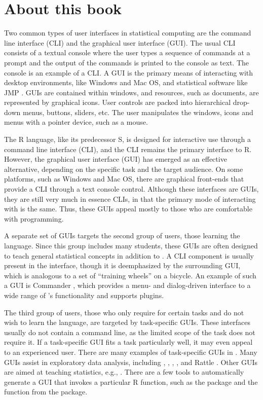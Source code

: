 


\section*{About this book}
\label{sec:about}

Two common types of user interfaces in statistical computing are the
command line interface (CLI) and the graphical user interface
(GUI). The usual CLI consists of a textual console where the user
types a sequence of commands at a prompt and the output of the
commands is printed to the console as text. The  console
is an example of a CLI. A GUI is the primary means of interacting with
desktop environments, like Windows and Mac OS, and statistical
software like JMP \citep{JMP}. GUIs are contained within windows, and
resources, such as documents, are represented by graphical icons.
User controls are packed into hierarchical drop-down menus, buttons,
sliders, etc. The user manipulates the windows, icons and menus with a
pointer device, such as a mouse.

The R language, like its predecessor S, is designed for interactive
use through a command line interface (CLI), and the CLI remains the
primary interface to R. However, the graphical user interface (GUI)
has emerged as an effective alternative, depending on the specific
task and the target audience.  On some platforms, such as Windows and
Mac OS, there are graphical front-ends that provide a CLI through a
text console control. Although these interfaces are GUIs, they are
still very much in essence CLIs, in that the primary mode of
interacting with  is the same. Thus, these GUIs appeal
mostly to those who are comfortable with  programming.  

A separate set of GUIs targets the second group of users, those
learning the  language. Since this group includes many
students, these GUIs are often designed to teach general statistical
concepts in addition to .  A CLI component is usually
present in the interface, though it is deemphasized by the surrounding
GUI, which is analogous to a set of ``training wheels'' on a
bicycle. An example of such a GUI is  Commander
\citep{rcmndr}, which
provides a menu- and dialog-driven interface
to a wide range of \R's functionality and supports plugins. 

The third group of users, those who only require  for
certain tasks and do not wish to learn the language, are targeted by
task-specific GUIs. These interfaces usually do not contain a command
line, as the limited scope of the task does not require it. If a
task-specific GUI fits a task particularly well, it may even appeal to
an experienced user. There are many examples of task-specific GUIs in
. Many GUIs assist in exploratory data analysis, including
 \citep{explorase},  \citep{limma},
, , and Rattle \citep{rattle}.  Other
GUIs are aimed at teaching statistics, e.g.,
. There are a few tools to automatically generate a
GUI that invokes a particular R function, such as the 
package and the  function from the
 package.

